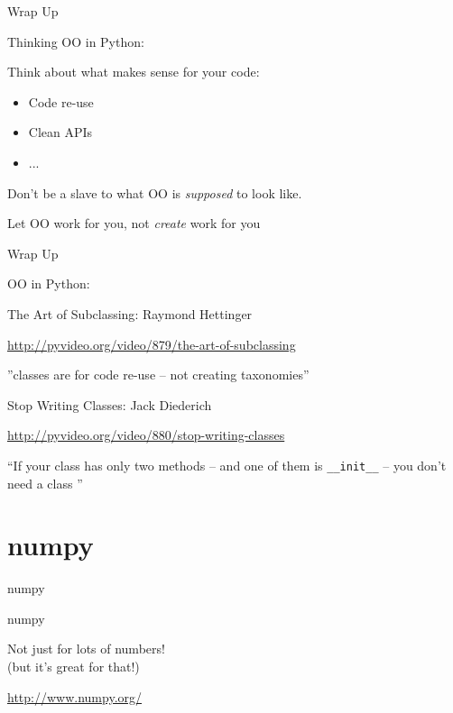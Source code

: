 \documentclass{beamer}
\begin{document}
\begin{frame}[fragile]{Wrap Up}

{\LARGE Thinking OO in Python:}

\vfill
{\large Think about what makes sense for your code:}
\begin{itemize}
  \item {\large Code re-use}
  \item {\large Clean APIs}
  \item {\large ... }
\end{itemize}

\vfill
{\large Don't be a slave to what OO is \emph{supposed} to look like. }

\vfill
{\large Let OO work for you, not \emph{create} work for you}

\end{frame}


\begin{frame}[fragile]{Wrap Up}

{\Large OO in Python:}

\vfill
{\Large The Art of Subclassing}: Raymond Hettinger

\vfill
{\small \url{http://pyvideo.org/video/879/the-art-of-subclassing}}

\vfill
''classes are for code re-use -- not creating taxonomies''

\vfill
{\Large Stop Writing Classes}: Jack Diederich

\vfill
{\small \url{http://pyvideo.org/video/880/stop-writing-classes}}

\vfill
``If your class has only two methods -- and one of them is \verb|__init__|
-- you don't need a class ''
\end{frame}


\section{numpy}

\begin{frame}[fragile]{numpy}

\vfill
\begin{center}
{\LARGE numpy}

\vfill
{\Large Not just for lots of numbers!\\[0.1in]
(but it's great for that!)}
\end{center}
\vfill
\url{http://www.numpy.org/}
\end{frame} 
\end{document}
